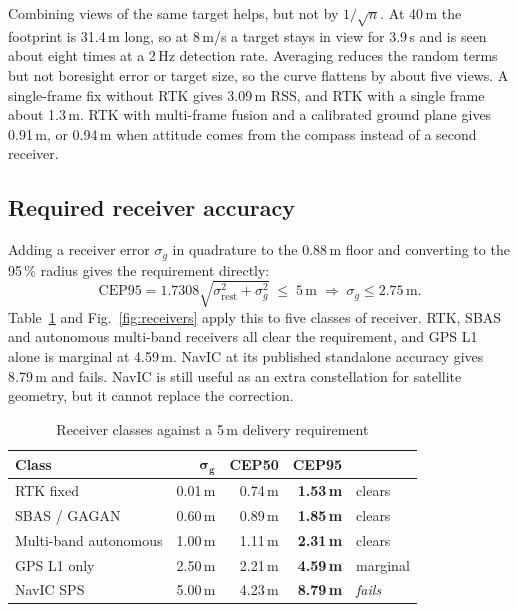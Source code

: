 \documentclass[conference]{IEEEtran}
\begin{document}
Combining views of the same target helps, but not by $1/\sqrt{n}$. At 40\,m the
footprint is 31.4\,m long, so at 8\,m/s a target stays in view for 3.9\,s and
is seen about eight times at a 2\,Hz detection rate. Averaging reduces the
random terms but not boresight error or target size, so the curve flattens by
about five views. A single-frame fix without RTK gives 3.09\,m RSS, and RTK with
a single frame about 1.3\,m. RTK with multi-frame fusion and a calibrated ground
plane gives 0.91\,m, or 0.94\,m when attitude comes from the compass instead of
a second receiver.

\subsection{Required receiver accuracy}

Adding a receiver error $\sigma_g$ in quadrature to the 0.88\,m floor and
converting to the 95\,\% radius gives the requirement directly:
\begin{equation}
\mathrm{CEP95} = 1.7308\sqrt{\sigma_{\mathrm{rest}}^{2} + \sigma_g^{2}}
\;\le\; 5\,\text{m}
\;\Longrightarrow\;
\sigma_g \le 2.75\,\text{m}.
\label{eq:gnssbreak}
\end{equation}
Table~\ref{tab:receivers} and Fig.~\ref{fig:receivers} apply this to five
classes of receiver. RTK, SBAS and autonomous multi-band receivers all clear the
requirement, and GPS L1 alone is marginal at 4.59\,m. NavIC at its published
standalone accuracy gives 8.79\,m and fails. NavIC is still useful as an extra
constellation for satellite geometry, but it cannot replace the correction.

\begin{table}[t]
\caption{Receiver classes against a 5\,m delivery requirement}
\label{tab:receivers}
\centering
\small
\begin{tabular}{@{}lrrrl@{}}
\toprule
\textbf{Class} & $\boldsymbol{\sigma_g}$ & \textbf{CEP50} & \textbf{CEP95} & \\
\midrule
RTK fixed             & 0.01\,m & 0.74\,m & \textbf{1.53\,m} & clears \\
SBAS / GAGAN          & 0.60\,m & 0.89\,m & \textbf{1.85\,m} & clears \\
Multi-band autonomous & 1.00\,m & 1.11\,m & \textbf{2.31\,m} & clears \\
GPS L1 only           & 2.50\,m & 2.21\,m & \textbf{4.59\,m} & marginal \\
NavIC SPS             & 5.00\,m & 4.23\,m & \textbf{8.79\,m} & \emph{fails} \\
\bottomrule
\end{tabular}
\end{table}
\end{document}
